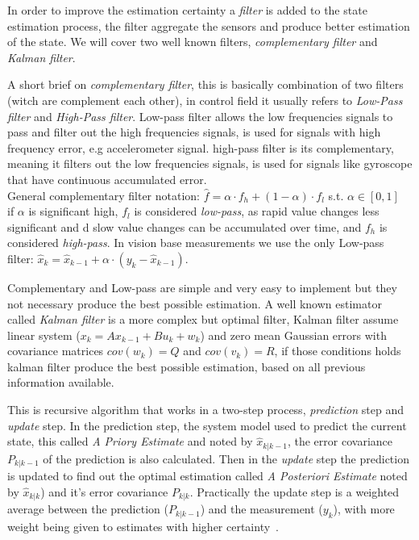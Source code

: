 \documentclass[ twoside, 12pt ]{article}
\begin{document}
In order to improve the estimation certainty a \textit{filter} is added to the state estimation process, the filter aggregate the sensors and produce better estimation of the state.
We will cover two well known filters, \textit{complementary filter} and \textit{Kalman filter}.

A short brief on \textit{complementary filter}, this is basically combination of two filters (witch are complement each other), in control field it usually refers to \textit{Low-Pass filter} and \textit{High-Pass filter}.
Low-pass filter allows the low frequencies signals to pass and filter out the high frequencies signals, is used for signals with high frequency error, e.g accelerometer signal.
high-pass filter is its complementary, meaning it filters out the low frequencies signals, is used for signals like gyroscope that have continuous accumulated error.
\\General complementary filter notation: $\hat{f} = \alpha \cdot f_h + (1-\alpha) \cdot f_l$ s.t. $\alpha \in [0,1]$
\\if $\alpha$ is significant high, $f_l$ is considered \textit{low-pass}, as rapid value changes less significant and d slow value changes can be accumulated over time, and $f_h$ is considered \textit{high-pass}.
In vision base measurements we use the only Low-pass filter:
$ \hat{x}_k = \hat{x}_{k-1} + \alpha \cdot (y_k - \hat{x}_{k-1}) $.

Complementary and Low-pass are simple and very easy to implement but they not necessary produce the best possible estimation.
A well known estimator called \textit{Kalman filter} is a more complex but optimal filter, Kalman filter assume linear system ($x_{k}=Ax_{k-1} + Bu_{k} + w_{k}$) and zero mean Gaussian errors with covariance matrices $cov(w_k)=Q$ and $cov(v_k)=R$, if those conditions holds kalman filter produce the best possible estimation, based on all previous information available.

This is recursive algorithm that works in a two-step process, \textit{prediction} step and \textit{update} step. 
In the prediction step, the system model used to predict the current state, this called \textit{A Priory Estimate} and noted by $\hat{x}_{k|k-1}$,
the error covariance $P_{k|k-1}$ of the prediction is also calculated.
Then in the \textit{update} step the prediction is updated to find out the optimal estimation called \textit{A Posteriori Estimate} noted by $\hat{x}_{k|k}$) and it's error covariance $P_{k|k}$.
Practically the update step is a weighted average between the prediction ($P_{k|k-1}$) and the measurement ($y_k$), with more weight being given to estimates with higher certainty~\cite{Kalman-filter}. 
\end{document}
